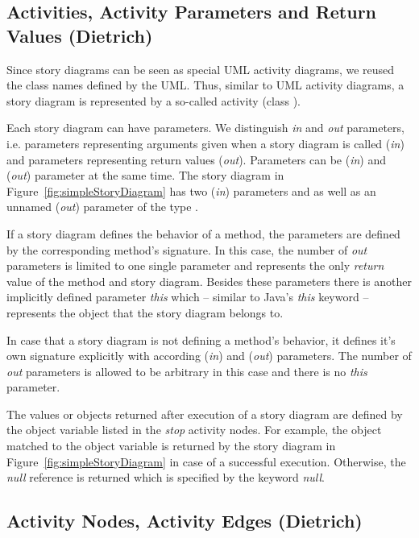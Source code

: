 \subsection{Activities, Activity Parameters and Return Values (Dietrich)}

Since story diagrams can be seen as special UML activity diagrams, we reused the class names defined by the UML.
Thus, similar to UML activity diagrams, a story diagram is represented by a so-called activity (class ).

Each story diagram can have parameters.
We distinguish \emph{in} and \emph{out} parameters,
i.e. parameters representing arguments given when a story diagram is called (\emph{in})
and parameters representing return values (\emph{out}).
Parameters can be (\emph{in}) and (\emph{out}) parameter at the same time.
The story diagram in Figure~\ref{fig:simpleStoryDiagram} has two (\emph{in}) parameters  and 
as well as an unnamed (\emph{out}) parameter of the type .

If a story diagram defines the behavior of a method, the parameters are defined by the corresponding method's signature.
In this case, the number of \emph{out} parameters is limited to one single parameter and represents the only \emph{return} value of the method and story diagram.
Besides these parameters there is another implicitly defined parameter \emph{this}
which -- similar to Java's \emph{this} keyword -- represents the object that the story diagram belongs to.

In case that a story diagram is not defining a method's behavior, it defines it's own signature explicitly with according (\emph{in}) and (\emph{out}) parameters.
The number of \emph{out} parameters is allowed to be arbitrary in this case and there is no \emph{this} parameter.

The values or objects returned after execution of a story diagram are defined by the object variable listed in the \emph{stop} activity nodes.
For example, the object matched to the object variable  is returned by the story diagram in Figure~\ref{fig:simpleStoryDiagram} in case of a successful execution.
Otherwise, the \emph{null} reference is returned which is specified by the keyword \emph{null}.


\subsection{Activity Nodes, Activity Edges (Dietrich)}

